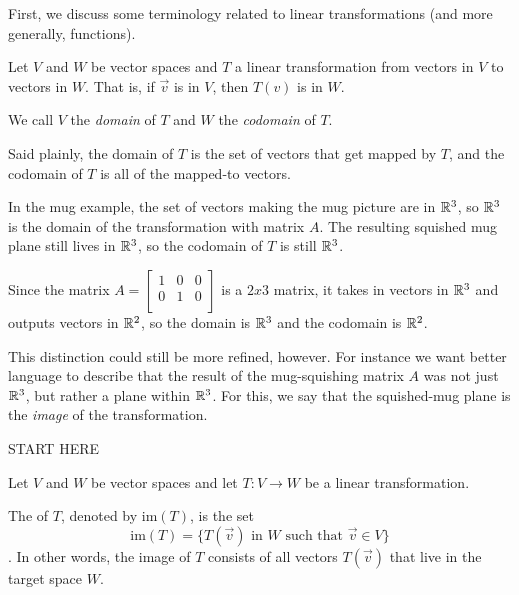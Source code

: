 \documentclass{ximera}
\begin{document}
First, we discuss some terminology related to linear transformations (and more generally, functions). 

\begin{definition}
  Let $V$ and $W$ be vector spaces and $T$ a linear transformation from vectors in $V$ to vectors in $W$. That is, if $\vec{v}$ is in $V$, then $T(v)$ is in $W$.

  We call $V$ the \emph{domain} of $T$ and $W$ the \emph{codomain} of $T$.
\end{definition}

Said plainly, the domain of $T$ is the set of vectors that get mapped by $T$, and the codomain of $T$ is all of the mapped-to vectors. 

In the mug example, the set of vectors making the mug picture are in $\mathbb{R}^3$, so $\mathbb{R}^3$ is the domain of the transformation with matrix $A$. The resulting squished mug plane still lives in $\mathbb{R}^3$, so the codomain of $T$ is still $\mathbb{R}^3$. 

Since the matrix $A=\begin{bmatrix}
  1&0&0\\
  0&1&0\\
\end{bmatrix}$ is a $2x3$ matrix, it takes in vectors in $\mathbb{R}^3$ and outputs vectors in $\mathbb{R}^2$, so the domain is $\mathbb{R}^3$ and the codomain is $\mathbb{R}^2$.

This distinction could still be more refined, however. For instance we want better language to describe that the result of the mug-squishing matrix $A$ was not just $\mathbb{R}^3$, but rather a plane within $\mathbb{R}^3$. For this, we say that the squished-mug plane is the \emph{image} of the transformation.

START HERE

\begin{definition}\label{def:imageofT}
Let $V$ and $W$ be vector spaces and let $T:V\rightarrow W$ be a linear transformation.  

The  of $T$, denoted by $\mbox{im}(T)$, is the set
$$\mbox{im}(T)=\{T(\vec{v})\text{ in }W\text{ such that }\vec{v}\in V\}$$.
In other words, the image of $T$ consists of all vectors $T(\vec{v})$ that live in the target space $W$.
\end{definition}
 
\end{document}

